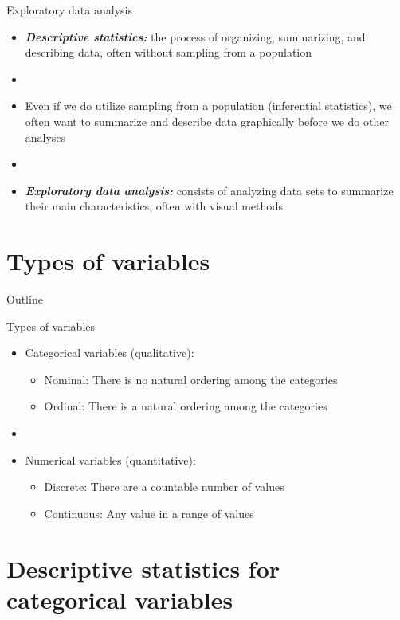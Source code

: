 \documentclass[xcolor=dvipsnames]{beamer}
\begin{document}
\begin{frame}{Exploratory data analysis}
	\begin{itemize}
		\item \textbf{\emph{Descriptive statistics:}} the process of organizing, summarizing, and describing data, often without sampling from a population \pause
		\item[]
		\item Even if we do utilize sampling from a population (inferential statistics), we often want to summarize and describe data graphically before we do other analyses \pause
		\item[]
		\item \textbf{\emph{Exploratory data analysis:}} consists of analyzing data sets to summarize their main characteristics, often with visual methods
	\end{itemize}
\end{frame}

\section{Types of variables}
\begin{frame}{Outline}
\tableofcontents[currentsection,subsectionstyle=show/shaded/hide]
\end{frame}

\begin{frame}{Types of variables}
\begin{itemize}
	\item Categorical variables (qualitative): \pause
	\begin{itemize}
		\item Nominal: There is no natural ordering among the categories \pause
		\item Ordinal: There is a natural ordering among the categories
	\end{itemize}
	\item[]
	\item Numerical variables (quantitative): \pause
	\begin{itemize}
		\item Discrete: There are a countable number of values \pause
		\item Continuous: Any value in a range of values
	\end{itemize}
\end{itemize}
\end{frame}

\section{Descriptive statistics for categorical variables}
\end{document}
